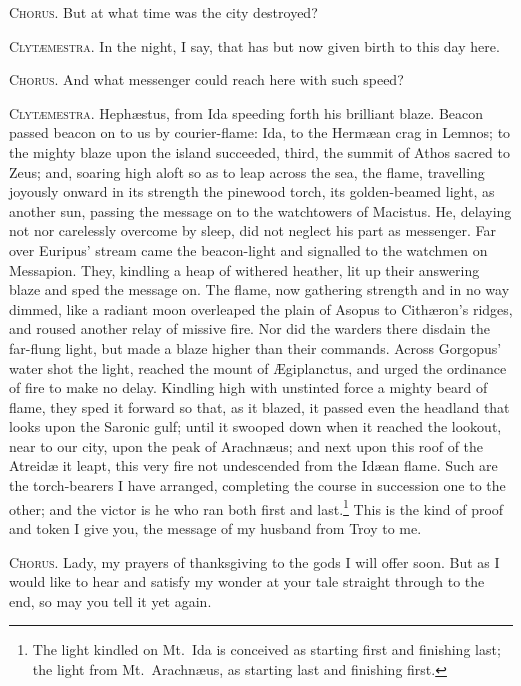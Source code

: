 \documentclass[12pt]{article}
\begin{document}
\textsc{Chorus.} But at what time was the city destroyed?

\textsc{Clyt{\ae}mestra.} In the night, I say, that has but now given birth to this day here.

\textsc{Chorus.} And what messenger could reach here with such speed?

\textsc{Clyt{\ae}mestra.} Heph{\ae}stus, from Ida speeding forth his brilliant blaze. Beacon passed beacon on to us by courier-flame: Ida, to the Herm{\ae}an crag in Lemnos; to the mighty blaze upon the island succeeded, third, the summit of Athos sacred to Zeus; and, soaring high aloft so as to leap across the sea, the flame, travelling joyously onward in its strength the pinewood torch, its golden-beamed light, as another sun, passing the message on to the watchtowers of Macistus. He, delaying not nor carelessly overcome by sleep, did not neglect his part as messenger. Far over Euripus' stream came the beacon-light and signalled to the watchmen on Messapion. They, kindling a heap of withered heather, lit up their answering blaze and sped the message on. The flame, now gathering strength and in no way dimmed, like a radiant moon overleaped the plain of Asopus to Cith{\ae}ron's ridges, and roused another relay of missive fire. Nor did the warders there disdain the far-flung light, but made a blaze higher than their commands. Across Gorgopus' water shot the light, reached the mount of {\AE}giplanctus, and urged the ordinance of fire to make no delay. Kindling high with unstinted force a mighty beard of flame, they sped it forward so that, as it blazed, it passed even the headland that looks upon the Saronic gulf; until it swooped down when it reached the lookout, near to our city, upon the peak of Arachn{\ae}us; and next upon this roof of the Atreid{\ae} it leapt, this very fire not undescended from the Id{\ae}an flame. Such are the torch-bearers I have arranged, completing the course in succession one to the other; and the victor is he who ran both first and last.\footnote{The light kindled on Mt.~Ida is conceived as starting first and finishing last; the light from Mt.~Arachn{\ae}us, as starting last and finishing first.} This is the kind of proof and token I give you, the message of my husband from Troy to me.

\textsc{Chorus.} Lady, my prayers of thanksgiving to the gods I will offer soon. But as I would like to hear and satisfy my wonder at your tale straight through to the end, so may you tell it yet again.
\end{document}
